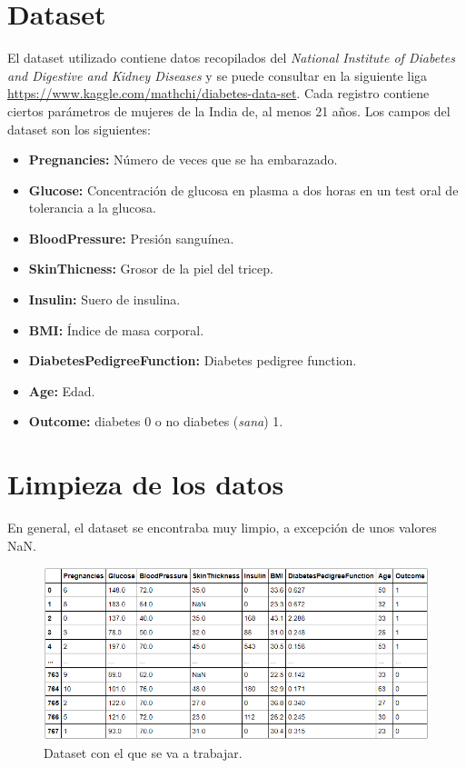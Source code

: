 \documentclass{article}
\begin{document}
\section{Dataset}

El dataset utilizado contiene datos recopilados del \emph{National Institute of Diabetes and Digestive and Kidney Diseases} y se puede consultar en la siguiente liga \url{https://www.kaggle.com/mathchi/diabetes-data-set}. Cada registro contiene ciertos parámetros de mujeres de la India de, al menos 21 años. Los campos del dataset son los siguientes:

\begin{itemize}
	\item \textbf{Pregnancies:} Número de veces que se ha embarazado.
	\item \textbf{Glucose:} Concentración de glucosa en plasma a dos horas en un test oral de tolerancia a la glucosa. 
	\item \textbf{BloodPressure:} Presión sanguínea.
	\item \textbf{SkinThicness:} Grosor de la piel del tricep.
	\item \textbf{Insulin:} Suero de insulina.
	\item \textbf{BMI:} Índice de masa corporal.
	\item \textbf{DiabetesPedigreeFunction:} Diabetes pedigree function.
	\item \textbf{Age:} Edad.
	\item \textbf{Outcome:} diabetes 0 o no diabetes (\emph{sana}) 1.
\end{itemize}


\section{Limpieza de los datos}

En general, el dataset se encontraba muy limpio, a excepción de unos valores NaN.

\begin{figure}[H]
	\centering
	\includegraphics[width=0.9\linewidth]{dataset_sucio.png}
	\caption{Dataset con el que se va a trabajar.}%
	\label{fig:dataset_sucio}
\end{figure}
\end{document}
